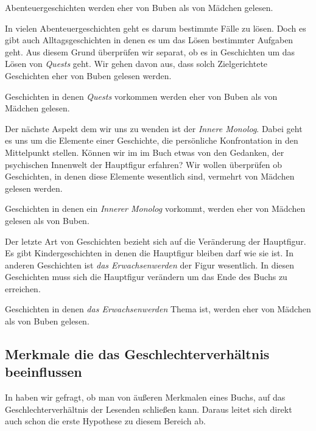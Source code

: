 \begin{subhyp}\label{h4.1}
   Abenteuergeschichten werden eher von Buben als von Mädchen gelesen.
\end{subhyp}

In vielen Abenteuergeschichten geht es darum bestimmte Fälle zu lösen.
Doch es gibt auch Alltagsgeschichten in denen es um das Lösen bestimmter
Aufgaben geht. Aus diesem Grund überprüfen wir separat, ob es in
Geschichten um das Lösen von \emph{Quests} geht. Wir gehen davon aus,
dass solch Zielgerichtete Geschichten eher von Buben gelesen werden.

\begin{subhyp}\label{h4.2}
    Geschichten in denen \emph{Quests} vorkommen werden eher von Buben als von Mädchen gelesen.
\end{subhyp}

Der nächste Aspekt dem wir uns zu wenden ist der \emph{Innere Monolog}.
Dabei geht es uns um die Elemente einer Geschichte, die persönliche
Konfrontation in den Mittelpunkt stellen. Können wir im im Buch etwas
von den Gedanken, der psychischen Innenwelt der Hauptfigur erfahren? Wir
wollen überprüfen ob Geschichten, in denen diese Elemente wesentlich
sind, vermehrt von Mädchen gelesen werden.

\begin{subhyp}\label{h4.3}
   Geschichten in denen ein \emph{Innerer Monolog} vorkommt, werden eher von Mädchen gelesen als von Buben.
\end{subhyp}

Der letzte Art von Geschichten bezieht sich auf die Veränderung der
Hauptfigur. Es gibt Kindergeschichten in denen die Hauptfigur bleiben
darf wie sie ist. In anderen Geschichten ist \emph{das Erwachsenwerden}
der Figur wesentlich. In diesen Geschichten muss sich die Hauptfigur
verändern um das Ende des Buchs zu erreichen.

\begin{subhyp}\label{h4.4}
   Geschichten in denen \emph{das Erwachsenwerden} Thema ist,
   werden eher von Mädchen als von Buben gelesen.
\end{subhyp}

\subsection{Merkmale die das Geschlechterverhältnis beeinflussen}

In  haben wir gefragt, ob man von äußeren Merkmalen
eines Buchs, auf das Geschlechterverhältnis der Lesenden schließen kann.
Daraus leitet sich direkt auch schon die erste Hypothese zu diesem
Bereich ab.

